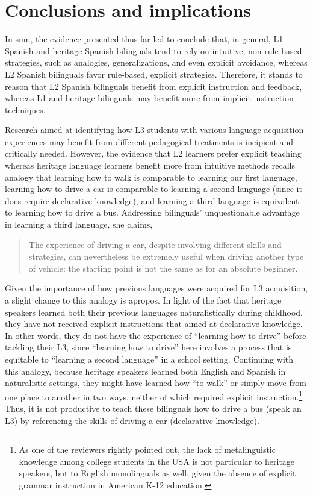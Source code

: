 \documentclass[output=paper]{../langscibook}
\begin{document}
\section{Conclusions and implications}


In sum, the evidence presented thus far led \citet{CarvalhoChild2018} to conclude that, in general, L1 Spanish and heritage Spanish bilinguals tend to rely on intuitive, non-rule-based strategies, such as analogies, generalizations, and even explicit avoidance, whereas L2 Spanish bilinguals favor rule-based, explicit strategies. Therefore, it stands to reason that L2 Spanish bilinguals benefit from explicit instruction and feedback, whereas L1 and heritage bilinguals may benefit more from implicit instruction techniques.

Research aimed at identifying how L3 students with various language acquisition experiences may benefit from different pedagogical treatments is incipient and critically needed. However, the evidence that L2 learners prefer explicit teaching whereas heritage language learners benefit more from intuitive methods recalls  analogy that learning how to walk is comparable to learning our first language, learning how to drive a car is comparable to learning a second language (since it does require declarative knowledge), and learning a third language is equivalent to learning how to drive a bus. Addressing bilinguals’ unquestionable advantage in learning a third language, she claims, 

\begin{quote}
The experience of driving a car, despite involving different skills and strategies, can nevertheless be extremely useful when driving another type of vehicle: the starting point is not the same as for an absolute beginner. \citep[73]{Cenoz2013}
\end{quote}

Given the importance of how previous languages were acquired for L3 acquisition, a slight change to this analogy is apropos. In light of the fact that heritage speakers learned both their previous languages naturalistically during childhood, they have not received explicit instructions that aimed at declarative knowledge. In other words, they do not have the experience of “learning how to drive” before tackling their L3, since “learning how to drive” here involves a process that is equitable to “learning a second language” in a school setting. Continuing with this analogy, because heritage speakers learned both English and Spanish in naturalistic settings, they might have learned how “to walk” or simply move from one place to another in two ways, neither of which required explicit instruction.\footnote{As one of the reviewers rightly pointed out, the lack of metalinguistic knowledge among college students in the USA is not particular to heritage speakers, but to English monolinguals as well, given the absence of explicit grammar instruction in American K-12 education.} Thus, it is not productive to teach these bilinguals how to drive a bus (speak an L3) by referencing the skills of driving a car (declarative knowledge).
\end{document}
